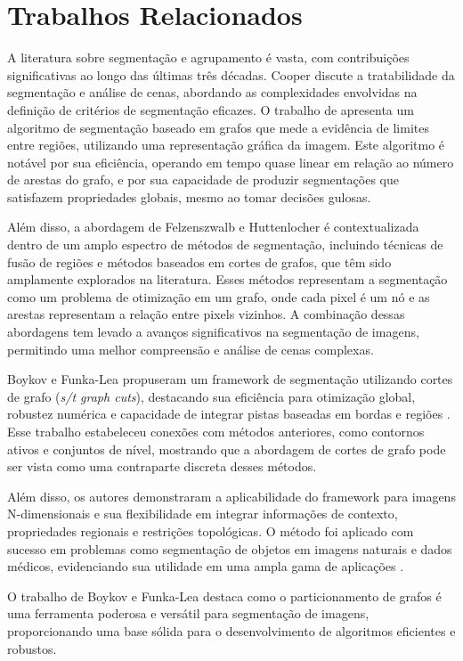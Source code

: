 \documentclass[12pt]{article}
\begin{document}
\section{Trabalhos Relacionados}
A literatura sobre segmentação e agrupamento é vasta,
com contribuições significativas ao longo das últimas três décadas.
Cooper discute a tratabilidade da segmentação e análise de cenas,
abordando as complexidades envolvidas na definição de critérios de segmentação eficazes.
O trabalho de \cite{felzenszwalb2004efficient} apresenta um algoritmo de segmentação baseado
em grafos que mede a evidência de limites entre regiões, utilizando uma representação gráfica da imagem.
Este algoritmo é notável por sua eficiência, operando em tempo quase linear em relação ao número de
arestas do grafo, e por sua capacidade de produzir segmentações que satisfazem propriedades globais,
mesmo ao tomar decisões gulosas.

Além disso, a abordagem de Felzenszwalb e Huttenlocher é contextualizada dentro de um amplo espectro
de métodos de segmentação, incluindo técnicas de fusão de regiões e métodos baseados em cortes de grafos,
que têm sido amplamente explorados na literatura. Esses métodos representam a segmentação como um problema
de otimização em um grafo, onde cada pixel é um nó e as arestas representam a relação entre pixels vizinhos.
A combinação dessas abordagens tem levado a avanços significativos na segmentação de imagens, permitindo
uma melhor compreensão e análise de cenas complexas.

Boykov e Funka-Lea propuseram um framework de segmentação utilizando cortes de grafo (\textit{s/t graph cuts}), destacando sua eficiência para otimização global, robustez numérica e capacidade de integrar pistas baseadas em bordas e regiões \cite{boykov2006graph}. Esse trabalho estabeleceu conexões com métodos anteriores, como contornos ativos e conjuntos de nível, mostrando que a abordagem de cortes de grafo pode ser vista como uma contraparte discreta desses métodos.

Além disso, os autores demonstraram a aplicabilidade do framework para imagens N-dimensionais e sua flexibilidade em integrar informações de contexto, propriedades regionais e restrições topológicas. O método foi aplicado com sucesso em problemas como segmentação de objetos em imagens naturais e dados médicos, evidenciando sua utilidade em uma ampla gama de aplicações \cite{boykov2006graph}.

O trabalho de Boykov e Funka-Lea destaca como o particionamento de grafos é uma ferramenta poderosa e versátil para segmentação de imagens, proporcionando uma base sólida para o desenvolvimento de algoritmos eficientes e robustos.
\end{document}
